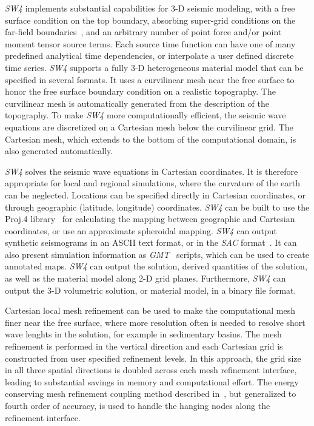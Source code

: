 \documentclass[11pt]{report}
\begin{document}
\emph{SW4} implements substantial capabilities for 3-D seismic modeling, with a free surface
condition on the top boundary, absorbing super-grid conditions on the far-field
boundaries~\cite{PetSjo-14}, and an arbitrary number of point force and/or point moment tensor
source terms. Each source time function can have one of many predefined analytical time
dependencies, or interpolate a user defined discrete time series. \emph{SW4} supports a fully 3-D
heterogeneous material model that can be specified in several formats. It uses a curvilinear mesh
near the free surface to honor the free surface boundary condition on a realistic topography. The
curvilinear mesh is automatically generated from the description of the topography. To make
\emph{SW4} more computationally efficient, the seismic wave equations are discretized on a Cartesian
mesh below the curvilinear grid. The Cartesian mesh, which extends to the bottom of the
computational domain, is also generated automatically.

\emph{SW4} solves the seismic wave equations in Cartesian coordinates. It is therefore appropriate
for local and regional simulations, where the curvature of the earth can be neglected. Locations can
be specified directly in Cartesian coordinates, or through geographic (latitude, longitude)
coordinates. \emph{SW4} can be built to use the Proj.4 library~\cite{Proj4} for calculating the
mapping between geographic and Cartesian coordinates, or use an approximate spheroidal
mapping. \emph{SW4} can output synthetic seismograms in an ASCII text format, or in the \emph{SAC}
format~\cite{Goldstein-et-al}. It can also present simulation information as
\emph{GMT}~\cite{WesselSmithGMT} scripts, which can be used to create annotated maps. \emph{SW4} can
output the solution, derived quantities of the solution, as well as the material model along 2-D
grid planes. Furthermore, \emph{SW4} can output the 3-D volumetric solution, or material model, in a
binary file format.

Cartesian local mesh refinement can be used to make the computational
mesh finer near the free surface, where more resolution often is needed to resolve short wave
lenghts in the solution, for example in sedimentary basins. The mesh refinement is performed in the
vertical direction and each Cartesian grid is constructed from user specified refinement levels. In
this approach, the grid size in all three spatial directions is doubled across each mesh refinement
interface, leading to substantial savings in memory and computational effort. The energy conserving
mesh refinement coupling method described in~\cite{PetSjo-10}, but generalized to fourth order of 
accuracy, is used to handle the hanging nodes along the refinement interface.
\end{document}
